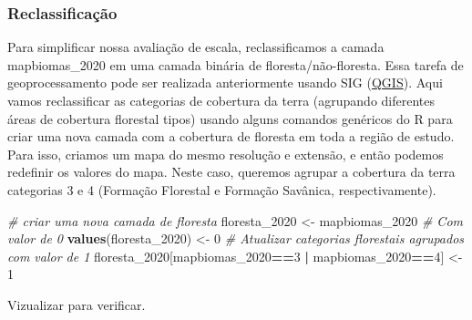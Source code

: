 \documentclass[
]{article}
\newenvironment{Shaded}{\begin{snugshade}}{\end{snugshade}}
\newcommand{\CommentTok}[1]{\textcolor[rgb]{0.56,0.35,0.01}{\textit{#1}}}
\newcommand{\DecValTok}[1]{\textcolor[rgb]{0.00,0.00,0.81}{#1}}
\newcommand{\FunctionTok}[1]{\textcolor[rgb]{0.13,0.29,0.53}{\textbf{#1}}}
\newcommand{\NormalTok}[1]{#1}
\newcommand{\OtherTok}[1]{\textcolor[rgb]{0.56,0.35,0.01}{#1}}
\newcommand{\SpecialCharTok}[1]{\textcolor[rgb]{0.81,0.36,0.00}{\textbf{#1}}}
\begin{document}
\newpage

\hypertarget{reclassificauxe7uxe3o-1}{%
\subsubsection{Reclassificação}\label{reclassificauxe7uxe3o-1}}

Para simplificar nossa avaliação de escala, reclassificamos a camada mapbiomas\_2020 em uma camada binária de floresta/não-floresta. Essa tarefa de geoprocessamento pode ser realizada anteriormente usando SIG (\href{https://docs.qgis.org/3.22/pt_BR/docs/training_manual/rasters/terrain_analysis.html\#moderate-fa-reclassifying-the-raster}{QGIS}). Aqui vamos reclassificar as categorias de cobertura da terra (agrupando diferentes áreas de cobertura florestal tipos) usando alguns comandos genéricos do R para criar uma nova camada com a cobertura de floresta em toda a região de estudo. Para isso, criamos um mapa do mesmo resolução e extensão, e então podemos redefinir os valores do mapa. Neste caso, queremos agrupar a cobertura da terra categorias 3 e 4 (Formação Florestal e Formação Savânica, respectivamente).

\begin{Shaded}
\begin{Highlighting}[]
\CommentTok{\# criar uma nova camada de floresta}
\NormalTok{floresta\_2020 }\OtherTok{\textless{}{-}}\NormalTok{ mapbiomas\_2020}
\CommentTok{\# Com valor de 0}
\FunctionTok{values}\NormalTok{(floresta\_2020) }\OtherTok{\textless{}{-}} \DecValTok{0}
\CommentTok{\# Atualizar categorias florestais agrupados com valor de 1}
\NormalTok{floresta\_2020[mapbiomas\_2020}\SpecialCharTok{==}\DecValTok{3} \SpecialCharTok{|}\NormalTok{ mapbiomas\_2020}\SpecialCharTok{==}\DecValTok{4}\NormalTok{] }\OtherTok{\textless{}{-}} \DecValTok{1} 
\end{Highlighting}
\end{Shaded}

\newpage

Vizualizar para verificar.
\end{document}
